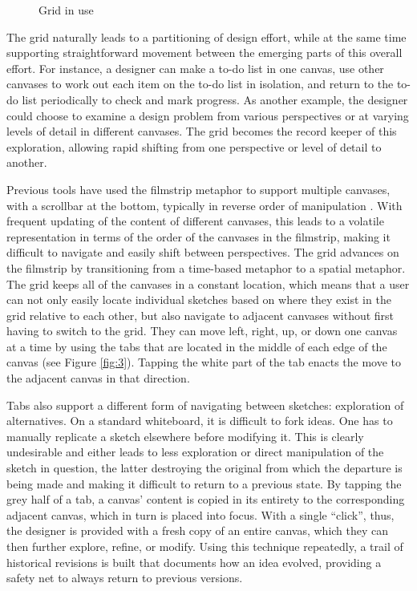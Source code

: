 \documentclass[12pt,fleqn]{ucithesis}
\begin{document}
\begin{figure}

\caption {Grid in use}
\label{fig:4}       %
\end{figure}
%

The grid naturally leads to a partitioning of design effort, while at the same time supporting straightforward movement between the emerging parts of this overall effort. For instance, a designer can make a to-do list in one canvas, use other canvases to work out each item on the to-do list in isolation, and return to the to-do list periodically to check and mark progress. As another example, the designer could choose to examine a design problem from various perspectives or at varying levels of detail in different canvases. The grid becomes the record keeper of this exploration, allowing rapid shifting from one perspective or level of detail to another.

Previous tools have used the filmstrip metaphor to support multiple canvases, with a scrollbar at the bottom, typically in reverse order of manipulation \citep{Stefik}. With frequent updating of the content of different canvases, this leads to a volatile representation in terms of the order of the canvases in the filmstrip, making it difficult to navigate and easily shift between perspectives. The grid advances on the filmstrip by transitioning from a time-based metaphor to a spatial metaphor. The grid keeps all of the canvases in a constant location, which means that a user can not only easily locate individual sketches based on where they exist in the grid relative to each other, but also navigate to adjacent canvases without first having to switch to the grid. They can move left, right, up, or down one canvas at a time by using the tabs that are located in the middle of each edge of the canvas (see Figure \ref{fig:3}). Tapping the white part of the tab enacts the move to the adjacent canvas in that direction.

Tabs also support a different form of navigating between sketches: exploration of alternatives. On a standard whiteboard, it is difficult to fork ideas. One has to manually replicate a sketch elsewhere before modifying it. This is clearly undesirable and either leads to less exploration or direct manipulation of the sketch in question, the latter destroying the original from which the departure is being made and making it difficult to return to a previous state. By tapping the grey half of a tab, a canvas' content is copied in its entirety to the corresponding adjacent canvas, which in turn is placed into focus. With a single ``click'', thus, the designer is provided with a fresh copy of an entire canvas, which they can then further explore, refine, or modify. Using this technique repeatedly, a trail of historical revisions is built that documents how an idea evolved, providing a safety net to always return to previous versions.
\end{document}
